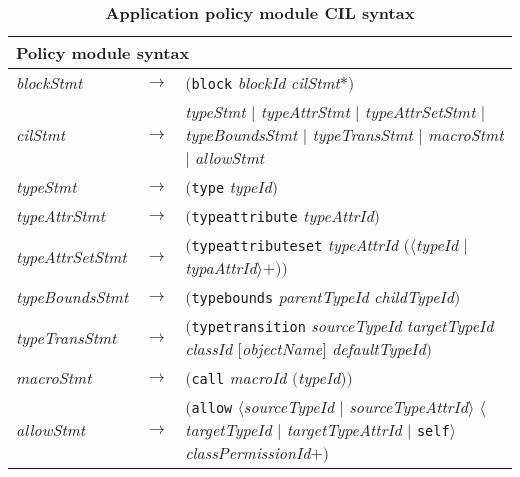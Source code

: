 \begin{table*}[h!]
	\centering
        \small
	\begin{tabularx}{\textwidth}{|p{5.8em}p{0.15em}X|}
	\hline
	\multicolumn{3}{|l|}{\textbf{Policy module syntax}} \\ \hline
	\textit{blockStmt} & $\to$& $($\texttt{block} \textit{blockId} \textit{cilStmt}$*$$)$ \\

	\textit{cilStmt} & $\to$&  \textit{ typeStmt} $|$
                                  \textit{typeAttrStmt} $|$
                                  \textit{typeAttrSetStmt} $|$
                                  \textit{typeBoundsStmt} $|$
                                  \textit{typeTransStmt} $|$
                                  \textit{macroStmt} $|$
                                  \textit{allowStmt} \\

	\textit{typeStmt} & $\to$ & $($\texttt{type} \textit{typeId}$)$ \\

	\textit{typeAttrStmt} & $\to$& $($\texttt{typeattribute} \textit{typeAttrId}$)$ \\

	\textit{typeAttrSetStmt} & $\to$ & $($\texttt{typeattributeset} \textit{typeAttrId} $($$\langle$\textit{typeId} $|$ \textit{typaAttrId$\rangle$}$+$$)$$)$ \\

	\textit{typeBoundsStmt} & $\to$& $($\texttt{typebounds} \textit{parentTypeId} \textit{childTypeId}$)$ \\

	\textit{typeTransStmt} & $\to$ &  $($\texttt{typetransition} \textit{sourceTypeId} \textit{targetTypeId} \textit{classId} $[$\textit{objectName}$]$ \textit{defaultTypeId}$)$ \\

	\textit{macroStmt} &$\to$ &$($\texttt{call} \textit{macroId} $($\textit{typeId}$)$$)$ \\

	\textit{allowStmt} & $\to$& $($\texttt{allow} $\langle$\textit{sourceTypeId} $|$ \textit{sourceTypeAttrId}$\rangle$  $\langle$\textit{targetTypeId} $|$ \textit{targetTypeAttrId} $|$ \texttt{self}$\rangle$  \textit{classPermissionId}$+$$)$ \\ \hline

      \end{tabularx}
        \caption{\bf Application policy module CIL syntax}      
  \label{tab:seapp_syntax}
\end{table*}


